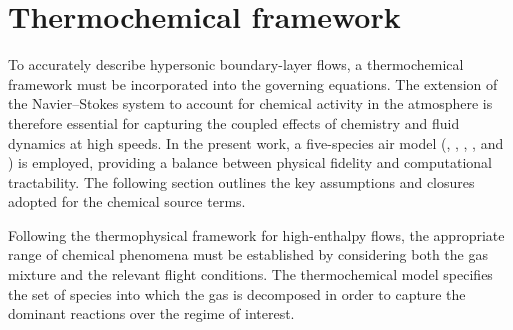 \section{Thermochemical framework}
To accurately describe hypersonic boundary-layer flows, a thermochemical framework must be incorporated into the governing equations. The extension of the Navier--Stokes system to account for chemical activity in the atmosphere is therefore essential for capturing the coupled effects of chemistry and fluid dynamics at high speeds. In the present work, a five-species air model (, , , , and ) is employed, providing a balance between physical fidelity and computational tractability. The following section outlines the key assumptions and closures adopted for the chemical source terms.

Following the thermophysical framework for high-enthalpy flows, the appropriate range of chemical phenomena must be established by considering both the gas mixture and the relevant flight conditions. The thermochemical model specifies the set of species into which the gas is decomposed in order to capture the dominant reactions over the regime of interest.

